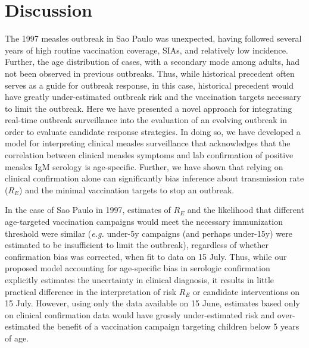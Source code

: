 \section{Discussion}\label{discussion}

The 1997 measles outbreak in Sao Paulo was unexpected, having followed several years of high routine vaccination coverage, SIAs, and relatively low
incidence. Further, the age distribution of cases, with a secondary mode among adults, had not been observed in previous outbreaks. Thus, while
historical precedent often serves as a guide for outbreak response, in this case, historical precedent would have greatly under-estimated
outbreak risk and the vaccination targets necessary to limit the outbreak. Here we have presented a novel approach for integrating
real-time outbreak surveillance into the evaluation of an evolving outbreak in order to evaluate candidate response strategies. In doing
so, we have developed a model for interpreting clinical measles surveillance that acknowledges that the correlation between clinical
measles symptoms and lab confirmation of positive measles IgM serology is age-specific. Further, we have shown that relying on clinical
confirmation alone can significantly bias inference about transmission rate ($R_E$) and the minimal vaccination targets to stop an outbreak.

In the case of Sao Paulo in 1997, estimates of $R_E$ and the likelihood that different age-targeted vaccination campaigns would meet the necessary immunization threshold were similar (\emph{e.g.} under-5y campaigns (and perhaps under-15y) were estimated to be insufficient to limit the outbreak), regardless of whether confirmation bias was corrected, when fit to data on 15 July. Thus, while our proposed model accounting for age-specific bias in serologic confirmation explicitly estimates the uncertainty in clinical diagnosis, it results in little practical difference in the interpretation of risk \(R_E\) or candidate interventions on 15 July. However, using only the data available on 15 June, estimates based only on clinical confirmation data would have grossly under-estimated risk and over-estimated the benefit of a vaccination campaign targeting children below 5 years of age. 

